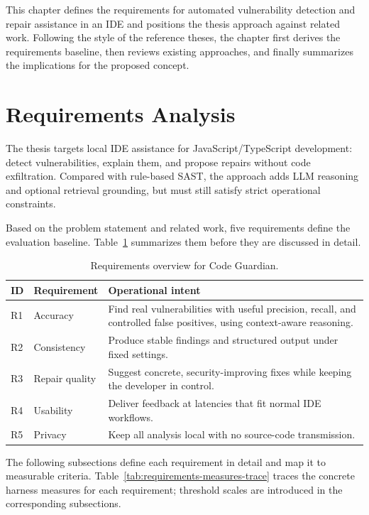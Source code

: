 This chapter defines the requirements for automated vulnerability detection and repair assistance in an IDE and positions the thesis approach against related work. Following the style of the reference theses, the chapter first derives the requirements baseline, then reviews existing approaches, and finally summarizes the implications for the proposed concept.


\section{Requirements Analysis}
\label{sec:requirements}

The thesis targets local IDE assistance for JavaScript/TypeScript development: detect vulnerabilities, explain them, and propose repairs without code exfiltration. Compared with rule-based SAST, the approach adds LLM reasoning and optional retrieval grounding, but must still satisfy strict operational constraints.

Based on the problem statement and related work, five requirements define the evaluation baseline. Table~\ref{tab:requirements-overview} summarizes them before they are discussed in detail.

\begin{table}[H]
  \centering
  \caption{Requirements overview for Code Guardian.}
  \label{tab:requirements-overview}
  \footnotesize
  \renewcommand{\arraystretch}{1.15}
  \begin{tabularx}{\textwidth}{p{}p{}X}
    \toprule
    ID & Requirement & Operational intent \\
    \midrule
    R1 & Accuracy & Find real vulnerabilities with useful precision, recall, and controlled false positives, using context-aware reasoning. \\
    R2 & Consistency & Produce stable findings and structured output under fixed settings. \\
    R3 & Repair quality & Suggest concrete, security-improving fixes while keeping the developer in control. \\
    R4 & Usability & Deliver feedback at latencies that fit normal IDE workflows. \\
    R5 & Privacy & Keep all analysis local with no source-code transmission. \\
    \bottomrule
  \end{tabularx}
\end{table}

The following subsections define each requirement in detail and map it to measurable criteria. Table~\ref{tab:requirements-measures-trace} traces the concrete harness measures for each requirement; threshold scales are introduced in the corresponding subsections.

